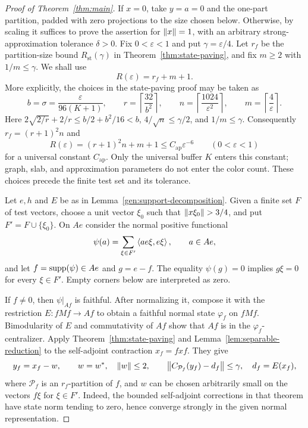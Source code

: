\begin{proof}[Proof of Theorem~\ref{thm:main}]
If $x=0$, take $y=a=0$ and the one-part partition, padded with zero
projections to the size chosen below. Otherwise, by
scaling it suffices to prove the assertion for $\left\lVert x\right\rVert=1$, with an
arbitrary strong-approximation tolerance $\delta>0$. Fix
$0<\varepsilon<1$ and put $\gamma=\varepsilon/4$. Let $r_f$ be the
partition-size bound $R_{\mathrm{st}}(\gamma)$ in
Theorem~\ref{thm:state-paving}, and fix $m\geq2$ with
$1/m\leq\gamma$. We shall use
\begin{equation}\label{gen:final-size}
 R(\varepsilon)=r_f+m+1.
\end{equation}
More explicitly, the choices in the state-paving proof may be taken as
\[
 b=\sigma=\frac{\varepsilon}{96(K+1)},\qquad
 r=\left\lceil\frac{32}{b^2}\right\rceil,\qquad
 n=\left\lceil\frac{1024}{\varepsilon^2}\right\rceil,\qquad
 m=\left\lceil\frac4\varepsilon\right\rceil.
\]
Here $2\sqrt{2/r}+2/r\leq b/2+b^2/16<b$,
$4/\sqrt n\leq\gamma/2$, and $1/m\leq\gamma$.
Consequently $r_f=(r+1)^2n$ and
\begin{equation}\label{gen:sixth-power}
 R(\varepsilon)=(r+1)^2n+m+1
       \leq C_{\mathrm{ap}}\varepsilon^{-6}
       \qquad(0<\varepsilon<1)
\end{equation}
for a universal constant $C_{\mathrm{ap}}$. Only the universal buffer
$K$ enters this constant; graph, slab, and approximation parameters
do not enter the color count.
These choices precede the finite test set and its tolerance.

Let $e,h$ and $E$ be as in Lemma~\ref{gen:support-decomposition}.
Given a finite set $F$ of test vectors, choose a unit vector $\xi_0$
such that $\left\lVert x\xi_0\right\rVert>3/4$, and put $F'=F\cup\{\xi_0\}$.
On $Ae$ consider the normal positive functional
\[
 \psi(a)=\sum_{\xi\in F'}\left\langle a e\xi,e\xi\right\rangle,\qquad a\in Ae,
\]
and let $f=\operatorname{supp}(\psi)\in Ae$ and $g=e-f$. The equality $\psi(g)=0$
implies $g\xi=0$ for every $\xi\in F'$. Empty corners below are
interpreted as zero.

If $f\ne0$, then $\psi|_{Af}$ is faithful. After normalizing it,
compose it with the restriction $E:fMf\to Af$ to obtain a faithful
normal state $\varphi_f$ on $fMf$. Bimodularity of $E$ and
commutativity of $Af$ show that $Af$ is in the
$\varphi_f$-centralizer. Apply Theorem~\ref{thm:state-paving} and
Lemma~\ref{lem:separable-reduction} to the self-adjoint contraction
$x_f=fxf$. They give
\[
 y_f=x_f-w,\qquad w=w^*,\quad\left\lVert w\right\rVert\leq2,
 \qquad
 \left\lVert C_{\mathcal P_f}(y_f)-d_f\right\rVert\leq\gamma,
 \quad d_f=E(x_f),
\]
where $\mathcal P_f$ is an $r_f$-partition of $f$, and $w$ can be
chosen arbitrarily small on the vectors $f\xi$ for $\xi\in F'$.
Indeed, the bounded self-adjoint corrections in that theorem have
state norm tending to zero, hence converge strongly in the given
normal representation.


\end{proof}
